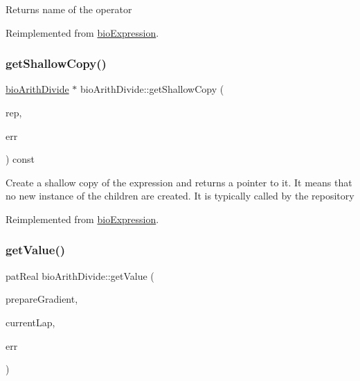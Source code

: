 \begin{DoxyReturn}{Returns}
name of the operator 
\end{DoxyReturn}


Reimplemented from \hyperlink{classbio_expression_a2353a4afb3a2b0af7c63aba086a72bde}{bio\+Expression}.

\mbox{\label{classbio_arith_divide_a381a838c2c02b9f1cf9c7a4b6586dbca}} 
\subsubsection{\texorpdfstring{get\+Shallow\+Copy()}{getShallowCopy()}}
{\footnotesize\ttfamily \hyperlink{classbio_arith_divide}{bio\+Arith\+Divide} $\ast$ bio\+Arith\+Divide\+::get\+Shallow\+Copy (\begin{DoxyParamCaption}\item[{\hyperlink{classbio_expression_repository}{bio\+Expression\+Repository} $\ast$}]{rep,  }\item[{pat\+Error $\ast$\&}]{err }\end{DoxyParamCaption}) const\hspace{0.3cm}{\ttfamily [virtual]}}

Create a shallow copy of the expression and returns a pointer to it. It means that no new instance of the children are created. It is typically called by the repository 

Reimplemented from \hyperlink{classbio_expression_a442534762693b92baaf33928979a1bf8}{bio\+Expression}.

\mbox{\label{classbio_arith_divide_a8c979df7aee15572084ac982d1bd0740}} 
\subsubsection{\texorpdfstring{get\+Value()}{getValue()}}
{\footnotesize\ttfamily pat\+Real bio\+Arith\+Divide\+::get\+Value (\begin{DoxyParamCaption}\item[{pat\+Boolean}]{prepare\+Gradient,  }\item[{pat\+U\+Long}]{current\+Lap,  }\item[{pat\+Error $\ast$\&}]{err }\end{DoxyParamCaption})\hspace{0.3cm}{\ttfamily [virtual]}}

